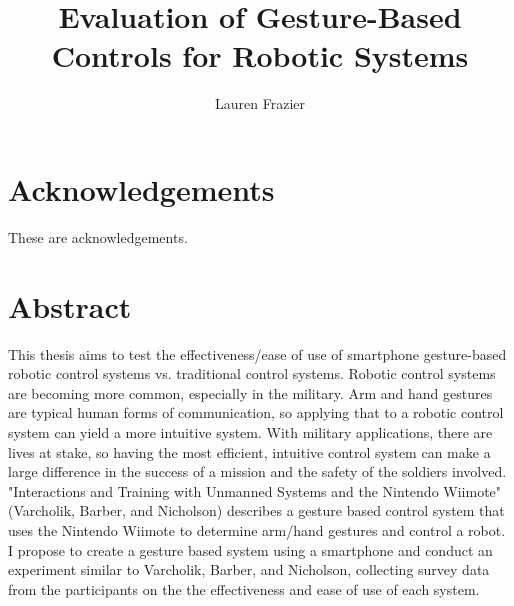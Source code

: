\documentclass[12pt,a4paper]{report}
\author{Lauren Frazier}
\title{Evaluation of Gesture-Based Controls for Robotic Systems}
\begin{document}
\maketitle
\newcommand{\todo}[1]{
    \addcontentsline{tdo}{todo}{\protect{#1}}
    \marginpar{#1}
}

\makeatletter \newcommand {}
  \newcommand\l@todo[2]
    {\par\noindent \textit{#2}, \parbox{10cm}{#1}\par} \makeatother
    
    

\setcounter{page}{1}
\tableofcontents
\listoftables
\listoffigures

\chapter*{Acknowledgements}
These are acknowledgements.

\chapter*{Abstract}
This thesis aims to test the effectiveness/ease of use of smartphone gesture-based robotic control systems vs. traditional control systems.  Robotic control systems are becoming more common, especially in the military. Arm and hand gestures are typical human forms of communication, so applying that to a robotic control system can yield a more intuitive system. With military applications, there are lives at stake, so having the most efficient, intuitive control system can make a large difference in the success of a mission and the safety of the soldiers involved. 
"Interactions and Training with Unmanned Systems and the Nintendo Wiimote" (Varcholik, Barber, and Nicholson) describes a gesture based control system that uses the Nintendo Wiimote to determine arm/hand gestures and control a robot. I propose to create a gesture based system using a smartphone and conduct an experiment similar to Varcholik, Barber, and Nicholson, collecting survey data from the participants on the the effectiveness and ease of use of each system.
\end{document}
